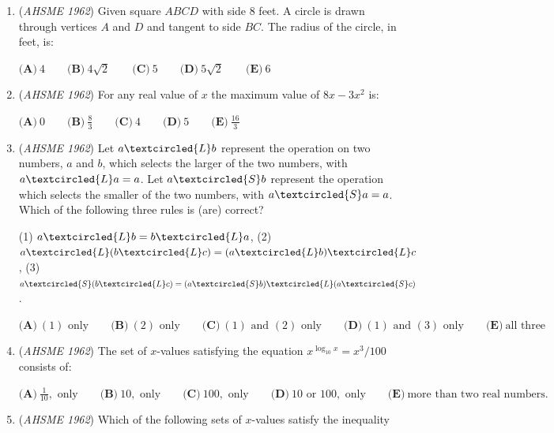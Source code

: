 \begin{enumerate}
 $\textbf{(A)}\ \frac{2}{3} \qquad  \textbf{(B)}\ \frac{11}{18} \qquad  \textbf{(C)}\ \frac{3}{2} \qquad  \textbf{(D)}\ 2 \qquad  \textbf{(E)}\ 3$


	\item (\textit{AHSME 1962}) Given square $ABCD$ with side $8$ feet. A circle is drawn through vertices $A$ and $D$ and tangent to side $BC$. The radius of the circle, in feet, is:


 $\textbf{(A)}\ 4 \qquad  \textbf{(B)}\ 4\sqrt{2} \qquad  \textbf{(C)}\ 5 \qquad  \textbf{(D)}\ 5\sqrt{2} \qquad  \textbf{(E)}\ 6$


	\item (\textit{AHSME 1962}) For any real value of $x$ the maximum value of $8x - 3x^2$ is:


 $\textbf{(A)}\ 0 \qquad  \textbf{(B)}\ \frac{8}{3} \qquad  \textbf{(C)}\ 4 \qquad  \textbf{(D)}\ 5 \qquad  \textbf{(E)}\ \frac{16}{3}$


	\item (\textit{AHSME 1962}) Let $a \textcircled{L} b$ represent the operation on two numbers, $a$ and $b$, which selects the larger of the two numbers, with $a \textcircled{L} a = a$. Let $a \textcircled{S} b$ represent the operation which selects the smaller of the two numbers, with $a \textcircled{S} a = a$. Which of the following three rules is (are) correct?


 (1) $a \textcircled{L} b = b \textcircled{L} a$, (2) $a \textcircled{L} (b \textcircled{L} c) = (a \textcircled{L} b) \textcircled{L} c$,
(3) $a \textcircled{S} (b \textcircled{L} c) = (a \textcircled{S} b) \textcircled{L} (a \textcircled{S} c)$.


 $\textbf{(A)}\ (1)\text{ only} \qquad  \textbf{(B)}\ (2)\text{ only} \qquad  \textbf{(C)}\ (1)\text{ and }(2)\text{ only} \qquad  \textbf{(D)}\ (1)\text{ and }(3)\text{ only} \qquad  \textbf{(E)}\ \text{all three}$


	\item (\textit{AHSME 1962}) The set of $x$-values satisfying the equation $x^{\log_{10} x} = x^3/100$ consists of:


 $\textbf{(A)}\ \frac{1}{10},\text{ only} \qquad  \textbf{(B)}\ 10,\text{ only} \qquad  \textbf{(C)}\ 100,\text{ only} \qquad  \textbf{(D)}\ 10 \text{ or } 100,\text{ only} \qquad  \textbf{(E)}\ \text{more than two real numbers.}$


	\item (\textit{AHSME 1962}) Which of the following sets of $x$-values satisfy the inequality


\end{enumerate}
